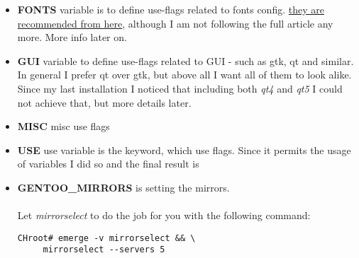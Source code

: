 \documentclass[10pt,a4paper]{article}
\begin{document}
\begin{itemize}


                    \item \textbf{FONTS} variable is to define use-flags related to fonts config. \href{http://kev009.com/wp/2009/12/getting-beautiful-fonts-in-gentoo-linux/}{they are recommended from here}, although I am not following the full article any more. More info later on.



                    \item \textbf{GUI} variable to define use-flags related to GUI - such as gtk, qt and similar. In general I prefer qt over gtk, but above all I want all of them to look alike. Since my last installation I noticed that including both \textit{qt4} and \textit{qt5} I could not achieve that, but more details later.



                    \item \textbf{MISC} misc use flags



                    \item \textbf{USE} use variable is the keyword, which use flags. Since it permits the usage of variables I did so and the final result is



                    \item \textbf{GENTOO\_MIRRORS} is setting the mirrors.



                        \paragraph{} Let \textit{mirrorselect} to do the job for you with the following command:

\begin{lstlisting}[style=BashInputCHRoot]
 CHroot# emerge -v mirrorselect && \
     mirrorselect --servers 5
\end{lstlisting}

                \end{itemize}
\end{document}
